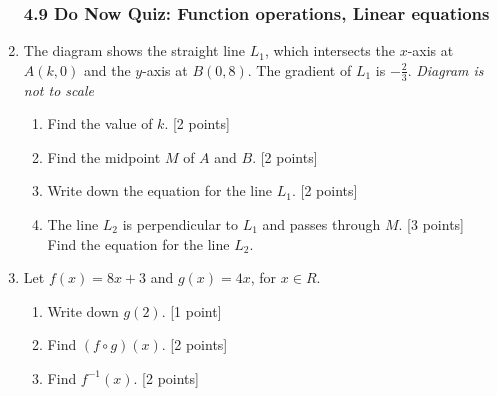 \documentclass[12pt, twoside]{article}
\begin{document}
\begin{enumerate}
    \subsubsection*{4.9 Do Now Quiz: Function operations, Linear equations}

    \item The diagram shows the straight line $L_1$, which intersects the $x$-axis at $A(k, 0)$ and the $y$-axis at $B(0,8)$. The gradient of $L_1$ is $-\frac{2}{3}$. \hfill \emph{Diagram is not to scale}
        \begin{center}
        \end{center}
        \begin{enumerate}%
            \item Find the value of $k$. \hfill [2 points]
            \item Find the midpoint $M$ of $A$ and $B$. \hfill [2 points]
            \item Write down the equation for the line $L_1$. \hfill [2 points]
            \item The line $L_2$ is perpendicular to $L_1$ and passes through $M$. \hfill [3 points]\\[0.2cm]
            Find the equation for the line $L_2$.
        \end{enumerate}

\newpage 
    \item Let $f(x)=8x+3$ and $g(x)=4x$, for $x \in R$.
        \begin{enumerate}
            \item Write down  $g(2)$. \hfill [1 point]
            \item Find $(f \circ g)(x)$. \hfill [2 points]
            \item Find $f^{-1}(x)$. \hfill [2 points]
        \end{enumerate}


\end{enumerate}
\end{document}
